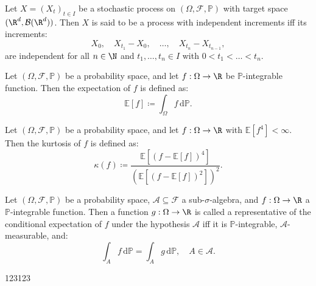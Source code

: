 \begin{defn}
Let $X=(X_{t})_{t\in I}$ be a stochastic process on $(\Omega,\mathcal{F},\mathbb{P})$ with target space $(\R^{d},\mathcal{B}(\R^{d}))$. Then $X$ is said to be a process with independent increments iff its increments:
\begin{equation}
    X_{0},\quad X_{t_{1}}-X_{0},\quad\dots,\quad X_{t_{n}}-X_{t_{n-1}},
\end{equation}
are independent for all $n\in\N$ and $t_{1},\dots,t_{n}\in I$ with $0<t_{1}<\dots<t_{n}$.
\end{defn}
\begin{defn}
Let $(\Omega,\mathcal{F},\mathbb{P})$ be a probability space, and let $f:\Omega\to\R$ be $\mathbb{P}$-integrable function. Then the expectation of $f$ is defined as:
\begin{equation}
    \mathbb{E}[f]\coloneqq\int_{\Omega}f\,\mathrm{d}\mathbb{P}.
\end{equation}
\end{defn}
\begin{defn}\label{defn:kurtosis}
Let $(\Omega,\mathcal{F},\mathbb{P})$ be a probability space, and let $f:\Omega\to\R$ with $\mathbb{E}[f^{4}]<\infty$. Then the kurtosis of $f$ is defined as:
\begin{equation}
    \kappa(f)\coloneqq\frac{\mathbb{E}[(f-\mathbb{E}[f])^{4}]}{\left(\mathbb{E}\left[(f-\mathbb{E}[f])^{2}\right]\right)^{2}}.
\end{equation}
\end{defn}
\begin{defn}
Let $(\Omega,\mathcal{F},\mathbb{P})$ be a probability space, $\mathcal{A}\subseteq\mathcal{F}$ a sub-$\sigma$-algebra, and $f:\Omega\to\R$ a $\mathbb{P}$-integrable function. Then a function $g:\Omega\to\R$ is called a representative of the conditional expectation of $f$ under the hypothesis $\mathcal{A}$ iff it is $\mathbb{P}$-integrable, $\mathcal{A}$-measurable, and:
\begin{equation}
    \int_{A}f\,\mathrm{d}\mathbb{P}=\int_{A}g\,\mathrm{d}\mathbb{P},\quad A\in\mathcal{A}.
\end{equation}
\end{defn}
123123

